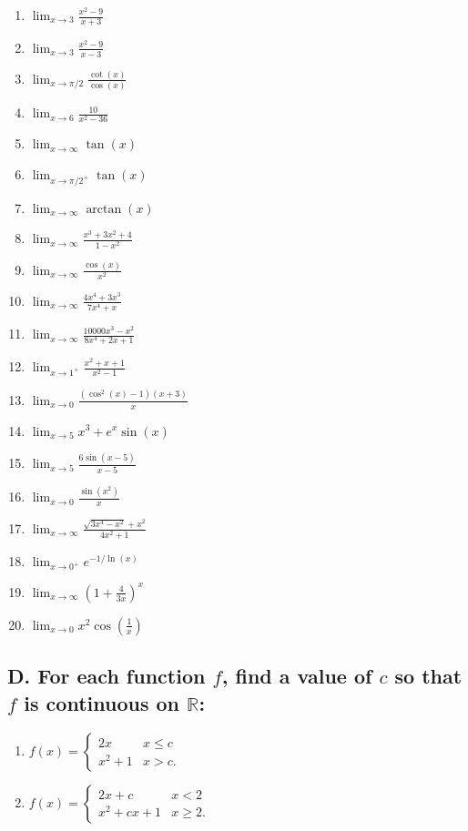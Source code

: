 \documentclass{article}
\begin{document}
\begin{multicols}{4}

\begin{enumerate}
\item $\displaystyle\lim_{x\to 3}\frac{x^2-9}{x+3}$
\item $\displaystyle\lim_{x\to 3}\frac{x^2-9}{x-3}$
\item $\displaystyle\lim_{x\to \pi/2}\frac{\cot(x)}{\cos(x)}$
\item $\displaystyle\lim_{x\to 6}\frac{10}{x^2-36}$
\item $\displaystyle\lim_{x\to \infty}\tan(x)$
\item $\displaystyle\lim_{x\to\pi/2^+} \tan(x)$
\item $\displaystyle\lim_{x\to \infty}\arctan(x)$
\item $\displaystyle\lim_{x\to \infty}\frac{x^3+3x^2+4}{1-x^2}$
\item $\displaystyle\lim_{x\to \infty}\frac{\cos(x)}{x^2}$
\item $\displaystyle\lim_{x\to \infty}\frac{4x^4+3x^3}{7x^4+x}$
\item $\displaystyle\lim_{x\to \infty}\frac{10000x^3-x^2}{8x^4+2x+1}$
\item $\displaystyle\lim_{x \rightarrow 1^+} \frac{x^2+x+1}{x^2-1}$
\item $\displaystyle\lim_{x\to 0}\frac{(\cos^2(x) - 1)(x+3)}{x}$
\item $\displaystyle\lim_{x\to 5}x^3+e^x\sin(x)$
\item $\displaystyle\lim_{x\to 5}\frac{6\sin(x-5)}{x-5}$
\item $\displaystyle\lim_{x\to 0}\frac{\sin(x^2)}{x}$
\item $\displaystyle\lim_{x\to \infty}\frac{\sqrt{3x^4-x^2}+x^2}{4x^2+1}$
\item $\displaystyle\lim_{x\to0^+}e^{-1/\ln\left(x\right)}$
\item $\displaystyle\lim_{x\to\infty}\left(1+\frac{4}{3x}\right)^x$
\item $\displaystyle\lim_{x\to0}x^{2}\cos\left(\frac{1}{x}\right)$
\end{enumerate}

\end{multicols}

\subsection*{D. For each function $f$, find a value of $c$ so that $f$ is continuous on $\mathbb{R}$:}
\begin{multicols}{2}
\begin{enumerate}
\item $f(x)=\begin{cases}2x & x \leq c \\ x^2+1 & x > c.\end{cases}$
\item $f(x)=\begin{cases}2x+c & x < 2 \\ x^2 + cx +1 & x \geq 2.\end{cases}$
\end{enumerate}
\end{multicols}
\end{document}
